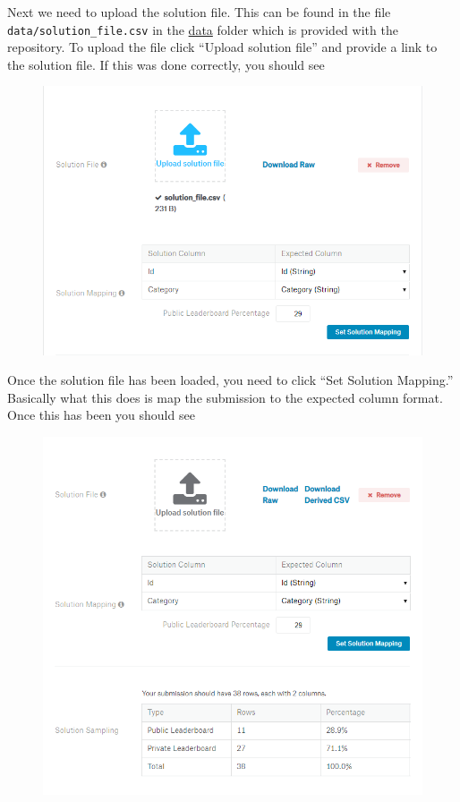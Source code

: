 \documentclass{article}
\begin{document}
Next we need to upload the solution file. This can be found in the file
\texttt{data/solution\_file.csv} in the \href{/data}{data} folder which
is provided with the repository. To upload the file click ``Upload
solution file'' and provide a link to the solution file. If this was
done correctly, you should see

\begin{figure}[H]
    \centering
    \includegraphics[width=\linewidth]{figures/solution-file-result.PNG}
\end{figure}

Once the solution file has been loaded, you need to click ``Set Solution
Mapping.'' Basically what this does is map the submission to the
expected column format. Once this has been you should see

\begin{figure}[H]
    \centering
    \includegraphics[width=\linewidth]{figures/solution-mapping.PNG}
\end{figure}
\end{document}
